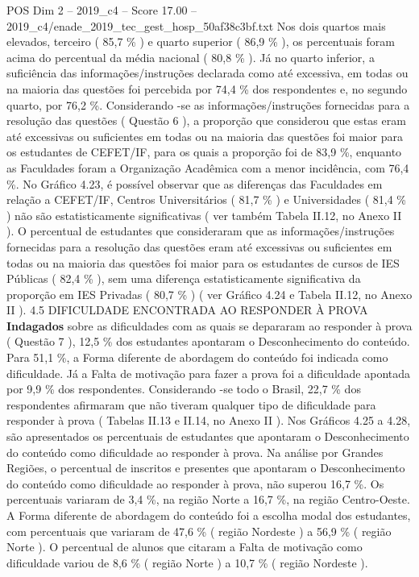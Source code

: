 \begin{textsample}{POS Dim 2 – 2019\_c4 – Score 17.00 – 2019\_c4/enade\_2019\_tec\_gest\_hosp\_50af38c3bf.txt}
Nos dois quartos mais elevados, terceiro ( 85,7 \% ) e quarto superior ( 86,9 \% ), os percentuais foram acima do percentual da média nacional ( 80,8 \% ).
Já no quarto inferior, a suficiência das informações/instruções declarada como até excessiva, em todas ou na maioria das questões foi percebida por 74,4 \% dos respondentes e, no segundo quarto, por 76,2 \%.
Considerando -se as informações/instruções fornecidas para a resolução das questões ( Questão 6 ), a proporção que considerou que estas eram até excessivas ou suficientes em todas ou na maioria das questões foi maior para os estudantes de CEFET/IF, para os quais a proporção foi de 83,9 \%, enquanto as Faculdades foram a Organização Acadêmica com a menor incidência, com 76,4 \%.
No Gráfico 4.23, é possível observar que as diferenças das Faculdades em relação a CEFET/IF, Centros Universitários ( 81,7 \% ) e Universidades ( 81,4 \% ) não são estatisticamente significativas ( ver também Tabela II.12, no Anexo II ).
O percentual de estudantes que consideraram que as informações/instruções fornecidas para a resolução das questões eram até excessivas ou suficientes em todas ou na maioria das questões foi maior para os estudantes de cursos de IES Públicas ( 82,4 \% ), sem uma diferença estatisticamente significativa da proporção em IES Privadas ( 80,7 \% ) ( ver Gráfico 4.24 e Tabela II.12, no Anexo II ). 4.5 DIFICULDADE ENCONTRADA AO RESPONDER À PROVA \textbf{Indagados} sobre as dificuldades com as quais se depararam ao responder à prova ( Questão 7 ), 12,5 \% dos estudantes apontaram o Desconhecimento do conteúdo.
Para 51,1 \%, a Forma diferente de abordagem do conteúdo foi indicada como dificuldade.
Já a Falta de motivação para fazer a prova foi a dificuldade apontada por 9,9 \% dos respondentes.
Considerando -se todo o Brasil, 22,7 \% dos respondentes afirmaram que não tiveram qualquer tipo de dificuldade para responder à prova ( Tabelas II.13 e II.14, no Anexo II ).
Nos Gráficos 4.25 a 4.28, são apresentados os percentuais de estudantes que apontaram o Desconhecimento do conteúdo como dificuldade ao responder à prova.
Na análise por Grandes Regiões, o percentual de inscritos e presentes que apontaram o Desconhecimento do conteúdo como dificuldade ao responder à prova, não superou 16,7 \%.
Os percentuais variaram de 3,4 \%, na região Norte a 16,7 \%, na região Centro-Oeste.
A Forma diferente de abordagem do conteúdo foi a escolha modal dos estudantes, com percentuais que variaram de 47,6 \% ( região Nordeste ) a 56,9 \% ( região Norte ).
O percentual de alunos que citaram a Falta de motivação como dificuldade variou de 8,6 \% ( região Norte ) a 10,7 \% ( região Nordeste ).

\end{textsample}
